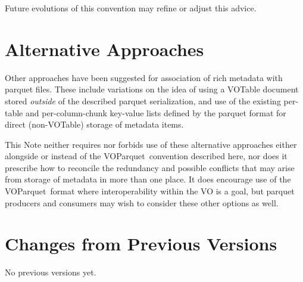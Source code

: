 \documentclass[11pt,a4paper]{ivoa}
\newcommand{\voparquet}{VOParquet}
\begin{document}
Future evolutions of this convention may refine or adjust this advice.

\section{Alternative Approaches}

Other approaches have been suggested for association of rich metadata
with parquet files.
These include variations on the idea of
using a VOTable document stored {\em outside\/} of the described parquet
serialization,
and use of the existing per-table and per-column-chunk key-value lists
defined by the parquet format for direct (non-VOTable) storage
of metadata items.

This Note neither requires nor forbids use of these alternative
approaches either alongside or instead of the \voparquet\ convention
described here, nor does it prescribe how to reconcile
the redundancy and possible conflicts that may arise from
storage of metadata in more than one place.
It does encourage use of the \voparquet\ format where interoperability
within the VO is a goal,
but parquet producers and consumers may wish to consider these other
options as well.



\appendix
\section{Changes from Previous Versions}

No previous versions yet.


\end{document}
